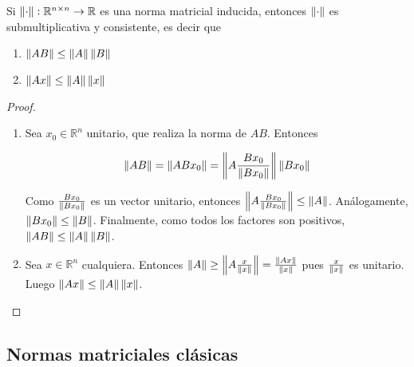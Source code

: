 \begin{propo}
Si $\norm{\cdot} : \mathbb{R}^{n \times n} \to \mathbb{R}$ es una norma matricial inducida, entonces $\norm{\cdot}$ es submultiplicativa y consistente, es decir que
\begin{enumerate}
\item $\norm{AB} \leq \norm{A}\norm{B}$
\item $\norm{Ax} \leq \norm{A}\norm{x}$
\end{enumerate}

\begin{proof}
\begin{enumerate}
\item Sea $x_0 \in \mathbb{R}^n$ unitario, que realiza la norma de $AB$. Entonces

\[\norm{AB} = \norm{ABx_0} = \norm{A\frac{Bx_0}{\norm{Bx_0}}}\norm{Bx_0}\]

Como $\frac{Bx_0}{\norm{Bx_0}}$ es un vector unitario, entonces $\norm{A\frac{Bx_0}{\norm{Bx_0}}} \leq \norm{A}$. Análogamente, $\norm{Bx_0} \leq \norm{B}$. Finalmente, como todos los factores son positivos, $\norm{AB} \leq \norm{A} \norm{B}$.

\item Sea $x \in \mathbb{R}^n$ cualquiera. Entonces $\norm{A} \geq \norm{A \frac{x}{\norm{x}}} = \frac{\norm{Ax}}{\norm{x}}$ pues $\frac{x}{\norm{x}}$ es unitario. Luego $\norm{Ax} \leq \norm{A}\norm{x}$.
\end{enumerate}
\end{proof}
\end{propo}

\subsection{Normas matriciales clásicas}

